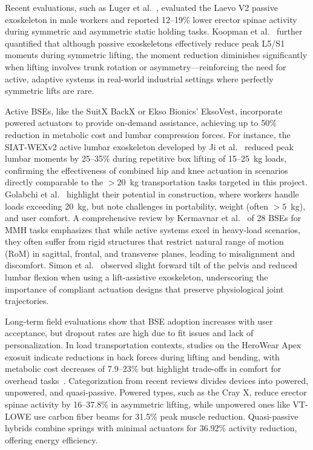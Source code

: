 Recent evaluations, such as Luger et al.~\cite{luger2023}, evaluated the Laevo V2 passive exoskeleton in male workers and reported 12--19\% lower erector spinae activity during symmetric and asymmetric static holding tasks. Koopman et al.~\cite{koopman2020} further quantified that although passive exoskeletons effectively reduce peak L5/S1 moments during symmetric lifting, the moment reduction diminishes significantly when lifting involves trunk rotation or asymmetry---reinforcing the need for active, adaptive systems in real-world industrial settings where perfectly symmetric lifts are rare.

Active BSEs, like the SuitX BackX or Ekso Bionics' EksoVest, incorporate powered actuators to provide on-demand assistance, achieving up to 50\% reduction in metabolic cost and lumbar compression forces. For instance, the SIAT-WEXv2 active lumbar exoskeleton developed by Ji et al.~\cite{ji2020} reduced peak lumbar moments by 25--35\% during repetitive box lifting of 15--25~kg loads, confirming the effectiveness of combined hip and knee actuation in scenarios directly comparable to the $>20$~kg transportation tasks targeted in this project. Golabchi et al.~\cite{golabchi2023} highlight their potential in construction, where workers handle loads exceeding 20~kg, but note challenges in portability, weight (often $>5$~kg), and user comfort. A comprehensive review by Kermavnar et al.~\cite{kermavnar2021} of 28 BSEs for MMH tasks emphasizes that while active systems excel in heavy-load scenarios, they often suffer from rigid structures that restrict natural range of motion (RoM) in sagittal, frontal, and transverse planes, leading to misalignment and discomfort. Simon et al.~\cite{simon2021} observed slight forward tilt of the pelvis and reduced lumbar flexion when using a lift-assistive exoskeleton, underscoring the importance of compliant actuation designs that preserve physiological joint trajectories.

Long-term field evaluations show that BSE adoption increases with user acceptance, but dropout rates are high due to fit issues and lack of personalization. In load transportation contexts, studies on the HeroWear Apex exosuit indicate reductions in back forces during lifting and bending, with metabolic cost decreases of 7.9--23\% but highlight trade-offs in comfort for overhead tasks~\cite{yandell2020,dai2021}. Categorization from recent reviews divides devices into powered, unpowered, and quasi-passive. Powered types, such as the Cray X, reduce erector spinae activity by 16--37.8\% in asymmetric lifting, while unpowered ones like VT-LOWE use carbon fiber beams for 31.5\% peak muscle reduction. Quasi-passive hybrids combine springs with minimal actuators for 36.92\% activity reduction, offering energy efficiency.


